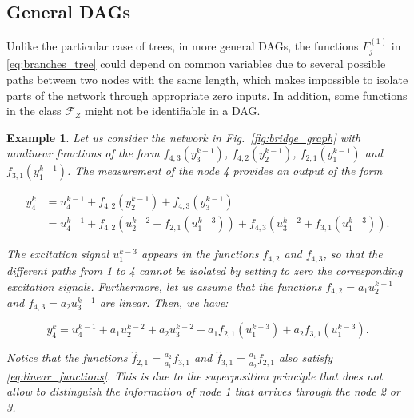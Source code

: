 \documentclass[letterpaper,10pt,journal]{IEEEtran}
\newcommand{\Fone}{\mathcal{F}_Z}
\newtheorem{example}{Example}
\begin{document}
\subsection{General DAGs}\label{sec:DAGs}


Unlike the particular case of trees, in more general DAGs, the functions $F_j^{(1)}$ in \eqref{eq:branches_tree} could depend on common variables due to several possible paths between two nodes with the same length, which makes impossible to isolate parts of the network through appropriate zero inputs. In addition, some functions in the class $\Fone$ might not be identifiable in a DAG.

\begin{example}
Let us consider the network in Fig.~\ref{fig:bridge_graph} with nonlinear functions of the form $f_{4,3}(y_3^{k-1})$, $f_{4,2}(y_2^{k-1})$, $f_{2,1}(y_1^{k-1})$ and $f_{3,1}(y_1^{k-1})$. The measurement of the node 4 provides an output of the form

\vspace{-3mm}

\small
\begin{align*}
    y_4^k&\!=\!u_4^{k-1}+f_{4,2}(y_2^{k-1})+f_{4,3}(y_3^{k-1})\\
    &\!=\!u_4^{k-1}\!+\!f_{4,2}(u_2^{k-2}\!+\!f_{2,1}(u_1^{k-3}))\!+\!f_{4,3}(u_3^{k-2}\!+\!f_{3,1}(u_1^{k-3})).
\end{align*}

\normalsize
\noindent The excitation signal $u_1^{k-3}$ appears in the functions $f_{4,2}$ and $f_{4,3}$, so that the different paths from 1 to 4 cannot be isolated by setting to zero the corresponding excitation signals. Furthermore, let us assume that the functions $f_{4,2}=a_1u_2^{k-1}$ and $f_{4,3}=a_2u_3^{k-1}$ are linear. Then, we have:

\vspace{-3mm}

\small
\begin{equation}\label{eq:linear_functions}
    y_4^k\!=\!u_4^{k-1}\!+\!a_1u_2^{k-2}\!+\!a_2u_3^{k-2}\!+\!a_1f_{2,1}(u_1^{k-3})\!+\!a_2f_{3,1}(u_1^{k-3}).
\end{equation}

\normalsize

\noindent Notice that the functions $\hat f_{2,1}=\frac{a_2}{a_1}f_{3,1}$ and $\hat f_{3,1}=\frac{a_1}{a_2}f_{2,1}$ also satisfy \eqref{eq:linear_functions}. This is due to the superposition principle that does not allow to distinguish the information of node 1 that arrives through the node 2 or 3.    
\end{example}
\end{document}

